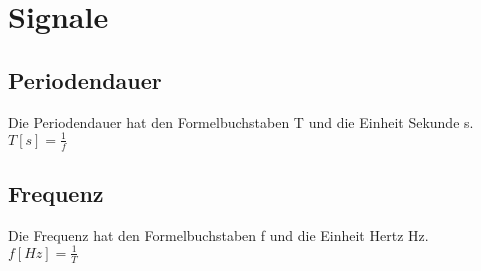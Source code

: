 
\section{Signale}


\subsection{Periodendauer}
Die Periodendauer hat den Formelbuchstaben T und die Einheit Sekunde s.\\
$T[s] = \frac{1}{f}$

\subsection{Frequenz}
Die Frequenz hat den Formelbuchstaben f und die Einheit Hertz Hz.\\
$f[Hz] = \frac{1}{T}$











